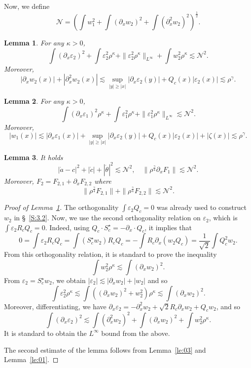 \documentclass[11pt]{amsart}
\newtheorem{lemma}{Lemma}
\theoremstyle{remark}
\newcommand\cN{\mathcal{N}}
\newcommand\ep{\varepsilon}
\begin{document}
Now, we define 
\[
\cN = \left(\int w_1^2+\int (\partial_x w_2)^2+ \int (\partial_x^2 w_2)^2\right)^\frac12.
\]
\begin{lemma}\label{le:04}
For any $\kappa>0$,
\[
\int (\partial_x \ep_2)^2 + \int \ep_2^2 \rho^\kappa 
+\|\ep_2^2 \rho^{\kappa}\|_{L^\infty}
+ \int w_2^2 \rho^\kappa \lesssim \cN^2.
\]
Moreover,
\[
|\partial_x w_2(x)|+|\partial_x^2 w_2 (x)|\lesssim \sup_{|y|\geq |x|} |\partial_x \ep_2(y)| 
+ Q_c(x) |\ep_2(x)|\lesssim \rho^\gamma.
\]
\end{lemma}

\begin{lemma}\label{le:05}
For any $\kappa>0$,
\[
\int (\partial_x \ep_1)^2 \rho^\kappa + \int \ep_1^2 \rho^\kappa
+\|\ep_1^2 \rho^{\kappa}\|_{L^\infty}\lesssim \cN^2.
\]
Moreover,
\[
|w_1(x)|\lesssim |\partial_x \ep_1(x)|
+ \sup_{|y|\geq |x|} |\partial_x \ep_2(y)| + Q_c(x) |\ep_2(x)|+
|\zeta(x)|\lesssim \rho^\gamma.
\]
\end{lemma}
\begin{lemma}\label{le:06}
It holds
\[
|\dot a-c|^2+|\dot c|+|\dot \theta|^2\lesssim \cN^2, \quad
\|\rho^\frac\gamma4\partial_x F_1\|\lesssim \cN^2.
\]
Moreover, $F_2=F_{2,1}+\partial_x F_{2,2}$ where
\[
\|\rho^\frac\gamma4 F_{2,1}\|+\|\rho^\frac\gamma4 F_{2,2}\|
\lesssim \cN^2.
\]
\end{lemma}
\begin{proof}[Proof of Lemma~\ref{le:04}]
The orthogonality $\int \ep_2 Q_c=0$ was already used to construct $w_2$ in \S~\ref{S:3.2}.
Now, we use the second orthogonality relation on $\ep_2$, which is $\int \ep_2 R_c Q_c=0$.
Indeed, 
using $Q_c \cdot S_c^\star = - \partial_x \cdot Q_c$, it implies that
\[
0=\int\ep_2 R_c Q_c=\int (S_c^\star w_2) R_c Q_c
=-\int R_c \partial_x ( w_2 Q_c) = \frac1{\sqrt{2}} \int Q_c^2 w_2.
\]
From this orthogonality relation, it is standard to prove
the inequality
\[
\int w_2^2 \rho^\kappa\lesssim \int (\partial_x w_2)^2.
\]
From $\ep_2=S_c^\star w_2$, we obtain
$|\ep_2|\lesssim |\partial_x w_2| + |w_2|$
and so
\[
\int \ep_2^2 \rho^\kappa \lesssim \int \left((\partial_x w_2)^2 + w_2^2\right) \rho^\kappa \lesssim \int (\partial_x w_2)^2.
\]
Moreover, differentiating, we have $\partial_x \ep_2 = -\partial_x^2 w_2
+ \sqrt{2} R_c \partial_x w_2 + Q_c w_2$, and so
\[
\int (\partial_x \ep_2)^2 \lesssim \int (\partial_x^2 w_2)^2 + \int (\partial_x w_2)^2 
+ \int w_2^2 \rho^\kappa.
\]
It is standard to obtain the $L^\infty$ bound from the above.

The second estimate of the lemma follows from  Lemma~\ref{le:03}
and Lemma~\ref{le:01}.
\end{proof}
\end{document}
